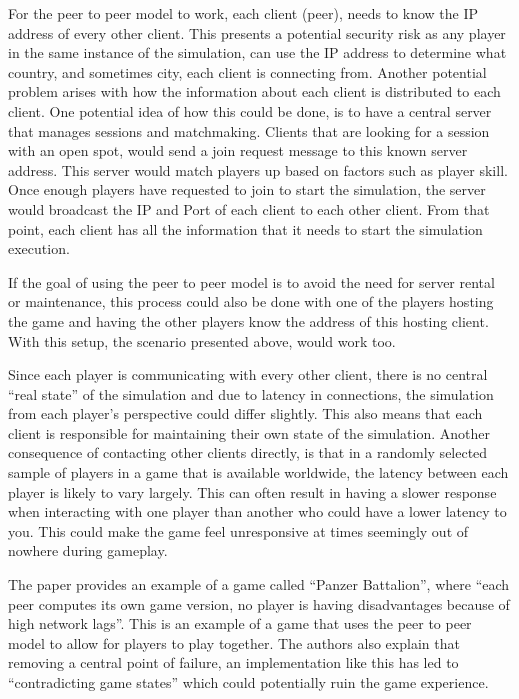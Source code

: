 For the peer to peer model to work, each client (peer), needs to know the IP address of every other client. This presents a potential security risk as any player in the same instance of the simulation, can use the IP address to determine what country, and sometimes city, each client is connecting from. Another potential problem arises with how the information about each client is distributed to each client. One potential idea of how this could be done, is to have a central server that manages sessions and matchmaking. Clients that are looking for a session with an open spot, would send a join request message to this known server address. This server would match players up based on factors such as player skill. Once enough players have requested to join to start the simulation, the server would broadcast the IP and Port of each client to each other client. From that point, each client has all the information that it needs to start the simulation execution.

If the goal of using the peer to peer model is to avoid the need for server rental or maintenance, this process could also be done with one of the players hosting the game and having the other players know the address of this hosting client. With this setup, the scenario presented above, would work too.

Since each player is communicating with every other client, there is no central ``real state'' of the simulation and due to latency in connections, the simulation from each player's perspective could differ slightly. This also means that each client is responsible for maintaining their own state of the simulation. Another consequence of contacting other clients directly, is that in a randomly selected sample of players in a game that is available worldwide, the latency between each player is likely to vary largely. This can often result in having a slower response when interacting with one player than another who could have a lower latency to you. This could make the game feel unresponsive at times seemingly out of nowhere during gameplay.

The paper  provides an example of a game called ``Panzer Battalion'', where ``each peer computes its own game version, no player is having disadvantages because of high network lags''. This is an example of a game that uses the peer to peer model to allow for players to play together. The authors also explain that removing a central point of failure, an implementation like this has led to ``contradicting game states'' which could potentially ruin the game experience.



